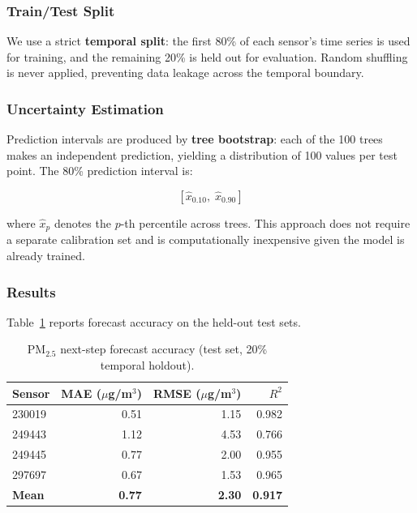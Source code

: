 \documentclass[11pt, letterpaper]{article}
\begin{document}
\subsubsection{Train/Test Split}

We use a strict \textbf{temporal split}: the first 80\% of each sensor's
time series is used for training, and the remaining 20\% is held out for
evaluation.
Random shuffling is never applied, preventing data leakage across the
temporal boundary.

\subsubsection{Uncertainty Estimation}

Prediction intervals are produced by \textbf{tree bootstrap}: each of
the 100 trees makes an independent prediction, yielding a distribution of
100 values per test point. The 80\% prediction interval is:

\[
  \left[\hat{x}_{0.10},\; \hat{x}_{0.90}\right]
\]

where $\hat{x}_{p}$ denotes the $p$-th percentile across trees.
This approach does not require a separate calibration set and is
computationally inexpensive given the model is already trained.

\subsubsection{Results}

Table~\ref{tab:forecast} reports forecast accuracy on the held-out test sets.

\begin{table}[h!]
\centering
\caption{PM$_{2.5}$ next-step forecast accuracy (test set, 20\% temporal holdout).}
\label{tab:forecast}
\begin{tabular}{lrrr}
\toprule
\textbf{Sensor} & \textbf{MAE ($\mu$g/m$^3$)} & \textbf{RMSE ($\mu$g/m$^3$)} & \textbf{$R^2$} \\
\midrule
230019 & 0.51 & 1.15 & 0.982 \\
249443 & 1.12 & 4.53 & 0.766 \\
249445 & 0.77 & 2.00 & 0.955 \\
297697 & 0.67 & 1.53 & 0.965 \\
\midrule
\textbf{Mean} & \textbf{0.77} & \textbf{2.30} & \textbf{0.917} \\
\bottomrule
\end{tabular}
\end{table}
\end{document}
